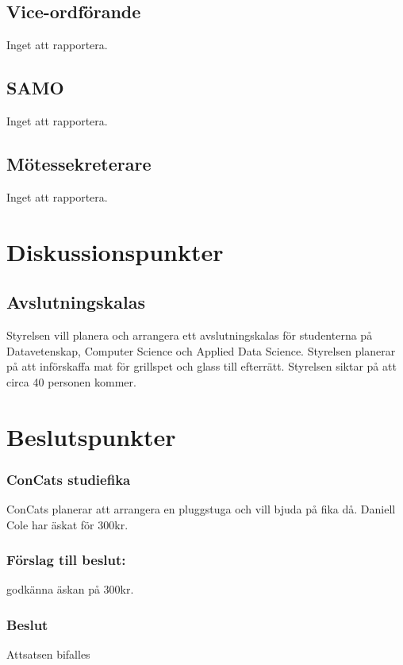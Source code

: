 \documentclass[protokoll]{dvd}
\begin{document}
\subsection{Vice-ordförande}
Inget att rapportera.

\subsection{SAMO}
Inget att rapportera.

\subsection{Mötessekreterare}
Inget att rapportera.

\newpage


\section{Diskussionspunkter}

\subsection*{Avslutningskalas}
Styrelsen vill planera och arrangera ett avslutningskalas för studenterna på
Datavetenskap, Computer Science och Applied Data Science.
Styrelsen planerar på att införskaffa mat för grillspet och glass till efterrätt.
Styrelsen siktar på att circa 40 personen kommer.

\section{Beslutspunkter}

\subsubsection*{ConCats studiefika}
ConCats planerar att arrangera en pluggstuga och vill bjuda på fika då.
Daniell Cole har äskat för 300kr.
\subsubsection*{Förslag till beslut:}
\begin{attsatser}
    \item godkänna äskan på 300kr.
\end{attsatser}

\subsubsection*{Beslut}
\begin{attsatser}
    \item Attsatsen bifalles
\end{attsatser}
\end{document}
